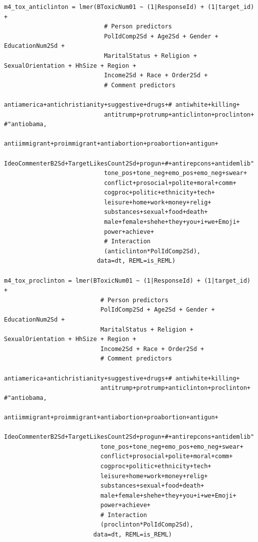 \documentclass{article}
\begin{document}
\begin{lstlisting}
m4_tox_anticlinton = lmer(BToxicNum01 ~ (1|ResponseId) + (1|target_id) + 
                            # Person predictors
                            PolIdComp2Sd + Age2Sd + Gender + EducationNum2Sd + 
                            MaritalStatus + Religion + SexualOrientation + HhSize + Region + 
                            Income2Sd + Race + Order2Sd + 
                            # Comment predictors  
                            antiamerica+antichristianity+suggestive+drugs+# antiwhite+killing+
                            antitrump+protrump+anticlinton+proclinton+ #"antiobama,
                            antiimmigrant+proimmigrant+antiabortion+proabortion+antigun+
                            IdeoCommenterB2Sd+TargetLikesCount2Sd+progun+#+antirepcons+antidemlib"
                            tone_pos+tone_neg+emo_pos+emo_neg+swear+
                            conflict+prosocial+polite+moral+comm+
                            cogproc+politic+ethnicity+tech+
                            leisure+home+work+money+relig+  
                            substances+sexual+food+death+    
                            male+female+shehe+they+you+i+we+Emoji+
                            power+achieve+
                            # Interaction
                            (anticlinton*PolIdComp2Sd),
                          data=dt, REML=is_REML)

m4_tox_proclinton = lmer(BToxicNum01 ~ (1|ResponseId) + (1|target_id) + 
                           # Person predictors
                           PolIdComp2Sd + Age2Sd + Gender + EducationNum2Sd + 
                           MaritalStatus + Religion + SexualOrientation + HhSize + Region + 
                           Income2Sd + Race + Order2Sd + 
                           # Comment predictors  
                           antiamerica+antichristianity+suggestive+drugs+# antiwhite+killing+
                           antitrump+protrump+anticlinton+proclinton+ #"antiobama,
                           antiimmigrant+proimmigrant+antiabortion+proabortion+antigun+
                           IdeoCommenterB2Sd+TargetLikesCount2Sd+progun+#+antirepcons+antidemlib"
                           tone_pos+tone_neg+emo_pos+emo_neg+swear+
                           conflict+prosocial+polite+moral+comm+
                           cogproc+politic+ethnicity+tech+
                           leisure+home+work+money+relig+  
                           substances+sexual+food+death+    
                           male+female+shehe+they+you+i+we+Emoji+
                           power+achieve+
                           # Interaction
                           (proclinton*PolIdComp2Sd),
                         data=dt, REML=is_REML)


\end{lstlisting}
\end{document}
